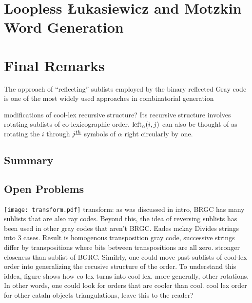 \chapter{Loopless Łukasiewicz and Motzkin Word Generation} \label{chap:luka-implementation}


\chapter{Final Remarks}
The approach of “reflecting” sublists employed by the binary reflected Gray code is one of the most widely used approaches in combinatorial generation

modifications of cool-lex recursive structure?
Its recursive structure involves rotating sublists of co-lexicographic order.  
$\lshiftindex[\alpha]{i}{j}$ can also be thought of as rotating the $i$ through $j\thh$ symbols of $\alpha$ right circularly by one.
\section{Summary}
\section{Open Problems}
\texttt{[image: transform.pdf]}
transform: as was discussed in intro, BRGC has many sublists that are also ray codes.  Beyond this, the idea of reversing sublists has been used in other gray codes that aren't BRGC. Eades mckay Divides strings into 3 cases. Result is homogenous transposition gray code, successive strings differ by transpositions where bits between transpositions are all zero. stronger closeness than sublist of BGRC. Similrly, one could move past sublists of cool-lex order into generalizing the recusive structure of the order. To understand this iddea, figure shows how co lex turns into cool lex.  more generally, other rotations.  In other words, one could look for orders that are cooler than cool. 
cool lex order for other cataln objects
triangulations, leave this to the reader?





